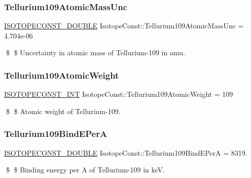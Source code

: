 \subsubsection{\texorpdfstring{Tellurium109\+Atomic\+Mass\+Unc}{Tellurium109AtomicMassUnc}}
{\footnotesize\ttfamily \mbox{\hyperlink{group___isotope_const-_macros_ga8f45a7272ce02c0b4c65c44636ed719a}{I\+S\+O\+T\+O\+P\+E\+C\+O\+N\+S\+T\+\_\+\+D\+O\+U\+B\+LE}} Isotope\+Const\+::\+Tellurium109\+Atomic\+Mass\+Unc = 4.\+704e-\/06}

\$ \$ Uncertainty in atomic mass of Tellurium-\/109 in amu. \mbox{\label{group___isotope_const-_tellurium-_te109_ga2340c0cd36682db650380b901c317bee}} 
\subsubsection{\texorpdfstring{Tellurium109\+Atomic\+Weight}{Tellurium109AtomicWeight}}
{\footnotesize\ttfamily \mbox{\hyperlink{group___isotope_const-_macros_ga5f18360b3e99483a35c32d789e62621c}{I\+S\+O\+T\+O\+P\+E\+C\+O\+N\+S\+T\+\_\+\+I\+NT}} Isotope\+Const\+::\+Tellurium109\+Atomic\+Weight = 109}

\$ \$ Atomic weight of Tellurium-\/109. \mbox{\label{group___isotope_const-_tellurium-_te109_ga54c7aee63524da5c486f1144dffd1c0f}} 
\subsubsection{\texorpdfstring{Tellurium109\+Bind\+E\+PerA}{Tellurium109BindEPerA}}
{\footnotesize\ttfamily \mbox{\hyperlink{group___isotope_const-_macros_ga8f45a7272ce02c0b4c65c44636ed719a}{I\+S\+O\+T\+O\+P\+E\+C\+O\+N\+S\+T\+\_\+\+D\+O\+U\+B\+LE}} Isotope\+Const\+::\+Tellurium109\+Bind\+E\+PerA = 8319.}

\$ \$ Binding energy per A of Tellurium-\/109 in keV. \mbox{\label{group___isotope_const-_tellurium-_te109_ga6c71178b10525e47f0dbf77564bb7d0e}} 
